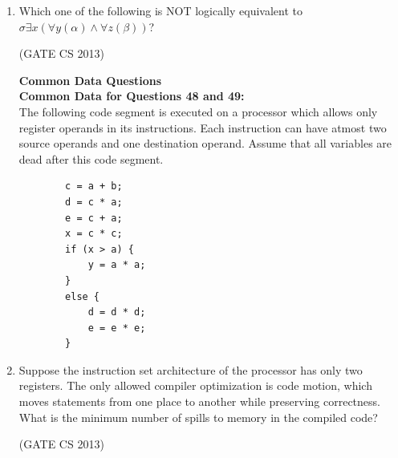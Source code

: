 \documentclass[a4paper, 11pt]{article}
\begin{document}
\begin{enumerate}
     \item Which one of the following is NOT logically equivalent to $\sigma \exists x (\forall y (\alpha)\land \forall z(\beta ))$?
     \begin{enumerate}
     \end{enumerate}
     \hfill (GATE CS 2013)

    \textbf{Common Data Questions}\\
    \textbf{Common Data for Questions 48 and 49:}\\
    The following code segment is executed on a processor which allows only register operands in its instructions. Each instruction can have atmost two source operands and one destination operand. Assume that all variables are dead after this code segment.
    \begin{lstlisting}
        c = a + b;
        d = c * a;
        e = c + a;
        x = c * c;
        if (x > a) {
            y = a * a;
        }
        else {
            d = d * d;
            e = e * e;
        } 

    \end{lstlisting}
    \item Suppose the instruction set architecture of the processor has only two registers. The only allowed compiler optimization is code motion, which moves statements from one place to another while preserving correctness. What is the minimum number of spills to memory in the compiled code?
    \begin{enumerate}
     \end{enumerate}
     \hfill (GATE CS 2013)


\end{enumerate}
\end{document}
